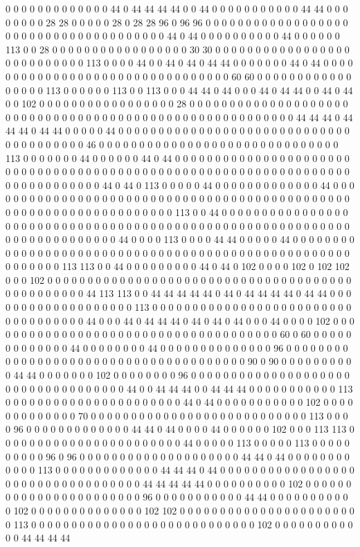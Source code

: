 0 0 0 0 0 0 0 0 0 0 0 0 0 44 0 44 44 44 44 0 0 44 0 0 0 0 0 0 0 0 0 0 0 44 44 0 0 0 0 0 0 0 0 28 28 0 0 0 0 0 28 0 28 28 96 0 96 96 0 0 0 0 0 0 0 0 0 0 0 0 0 0 0 0 0 0 0 0 0 0 0 0 0 0 0 0 0 0 0 0 0 0 0 0 0 0 44 0 44 0 0 0 0 0 0 0 0 0 0 44 0 0 0 0 0 0 113 0 0 28 0 0 0 0 0 0 0 0 0 0 0 0 0 0 0 0 0 30 30 0 0 0 0 0 0 0 0 0 0 0 0 0 0 0 0 0 0 0 0 0 0 0 0 0 0 0 113 0 0 0 0 44 0 0 44 0 44 0 44 44 0 0 0 0 0 0 0 44 0 44 0 0 0 0 0 0 0 0 0 0 0 0 0 0 0 0 0 0 0 0 0 0 0 0 0 0 0 0 0 0 0 0 60 60 0 0 0 0 0 0 0 0 0 0 0 0 0 0 0 0 0 113 0 0 0 0 0 0 113 0 0 113 0 0 0 44 44 0 44 0 0 0 44 0 44 44 0 0 44 0 44 0 0 102 0 0 0 0 0 0 0 0 0 0 0 0 0 0 0 0 0 28 0 0 0 0 0 0 0 0 0 0 0 0 0 0 0 0 0 0 0 0 0 0 0 0 0 0 0 0 0 0 0 0 0 0 0 0 0 0 0 0 0 0 0 0 0 0 0 0 0 0 0 0 0 0 0 0 44 44 44 0 44 44 44 0 44 44 0 0 0 0 0 44 0 0 0 0 0 0 0 0 0 0 0 0 0 0 0 0 0 0 0 0 0 0 0 0 0 0 0 0 0 0 0 0 0 0 0 0 0 0 0 46 0 0 0 0 0 0 0 0 0 0 0 0 0 0 0 0 0 0 0 0 0 0 0 0 0 0 0 0 0 0 113 0 0 0 0 0 0 0 44 0 0 0 0 0 0 44 0 44 0 0 0 0 0 0 0 0 0 0 0 0 0 0 0 0 0 0 0 0 0 0 0 0 0 0 0 0 0 0 0 0 0 0 0 0 0 0 0 0 0 0 0 0 0 0 0 0 0 0 0 0 0 0 0 0 0 0 0 0 0 0 0 0 0 0 0 0 0 0 0 0 0 0 0 0 0 44 0 44 0 113 0 0 0 0 0 44 0 0 0 0 0 0 0 0 0 0 0 0 0 44 0 0 0 0 0 0 0 0 0 0 0 0 0 0 0 0 0 0 0 0 0 0 0 0 0 0 0 0 0 0 0 0 0 0 0 0 0 0 0 0 0 0 0 0 0 0 0 0 0 0 0 0 0 0 0 0 0 0 0 0 0 0 0 0 0 0 0 113 0 0 44 0 0 0 0 0 0 0 0 0 0 0 0 0 0 0 0 0 0 0 0 0 0 0 0 0 0 0 0 0 0 0 0 0 0 0 0 0 0 0 0 0 0 0 0 0 0 0 0 0 0 0 0 0 0 0 0 0 0 0 0 0 0 0 0 0 0 0 0 0 0 0 0 0 44 0 0 0 0 113 0 0 0 0 44 44 0 0 0 0 0 44 0 0 0 0 0 0 0 0 0 0 0 0 0 0 0 0 0 0 0 0 0 0 0 0 0 0 0 0 0 0 0 0 0 0 0 0 0 0 0 0 0 0 0 0 0 0 0 0 0 0 0 0 0 0 0 0 0 0 113 113 0 0 44 0 0 0 0 0 0 0 0 0 44 0 44 0 102 0 0 0 0 102 0 102 102 0 0 0 102 0 0 0 0 0 0 0 0 0 0 0 0 0 0 0 0 0 0 0 0 0 0 0 0 0 0 0 0 0 0 0 0 0 0 0 0 0 0 0 0 0 0 0 0 0 0 0 0 44 113 113 0 0 44 44 44 44 44 0 44 0 44 44 44 44 0 44 44 0 0 0 0 0 0 0 0 0 0 0 0 0 0 0 0 0 0 0 113 0 0 0 0 0 0 0 0 0 0 0 0 0 0 0 0 0 0 0 0 0 0 0 0 0 0 0 0 0 0 0 0 0 0 0 44 0 0 0 44 0 44 44 44 0 44 0 44 0 44 0 0 0 44 0 0 0 0 102 0 0 0 0 0 0 0 0 0 0 0 0 0 0 0 0 0 0 0 0 0 0 0 0 0 0 0 0 0 0 0 0 0 0 0 0 0 60 0 60 0 0 0 0 0 0 0 0 0 0 0 0 0 44 0 0 0 0 0 0 0 0 44 0 0 0 0 0 0 0 0 0 0 0 0 0 0 96 0 0 0 0 0 0 0 0 0 0 0 0 0 0 0 0 0 0 0 0 0 0 0 0 0 0 0 0 0 0 0 0 0 0 0 0 0 0 90 0 90 0 0 0 0 0 0 0 0 0 0 44 44 0 0 0 0 0 0 0 102 0 0 0 0 0 0 0 0 96 0 0 0 0 0 0 0 0 0 0 0 0 0 0 0 0 0 0 0 0 0 0 0 0 0 0 0 0 0 0 0 0 0 0 0 44 0 0 44 44 44 0 0 44 44 44 0 0 0 0 0 0 0 0 0 0 0 113 0 0 0 0 0 0 0 0 0 0 0 0 0 0 0 0 0 0 0 0 0 0 44 0 44 0 0 0 0 0 0 0 0 0 0 0 102 0 0 0 0 0 0 0 0 0 0 0 0 0 70 0 0 0 0 0 0 0 0 0 0 0 0 0 0 0 0 0 0 0 0 0 0 0 0 0 0 0 113 0 0 0 0 96 0 0 0 0 0 0 0 0 0 0 0 0 0 44 44 0 44 0 0 0 0 44 0 0 0 0 0 0 102 0 0 0 113 113 0 0 0 0 0 0 0 0 0 0 0 0 0 0 0 0 0 0 0 0 0 0 0 44 0 0 0 0 0 113 0 0 0 0 0 113 0 0 0 0 0 0 0 0 0 0 96 0 96 0 0 0 0 0 0 0 0 0 0 0 0 0 0 0 0 0 0 0 0 44 44 0 44 0 0 0 0 0 0 0 0 0 0 0 0 113 0 0 0 0 0 0 0 0 0 0 0 0 0 44 44 44 0 44 0 0 0 0 0 0 0 0 0 0 0 0 0 0 0 0 0 0 0 0 0 0 0 0 0 0 0 0 0 0 0 0 0 0 44 44 44 44 44 0 0 0 0 0 0 0 0 0 0 102 0 0 0 0 0 0 0 0 0 0 0 0 0 0 0 0 0 0 0 0 0 0 0 96 0 0 0 0 0 0 0 0 0 0 0 44 44 0 0 0 0 0 0 0 0 0 0 0 102 0 0 0 0 0 0 0 0 0 0 0 0 0 0 102 102 0 0 0 0 0 0 0 0 0 0 0 0 0 0 0 0 0 0 0 0 0 0 0 113 0 0 0 0 0 0 0 0 0 0 0 0 0 0 0 0 0 0 0 0 0 0 0 0 0 0 0 0 102 0 0 0 0 0 0 0 0 0 0 0 0 44 44 44 44 
